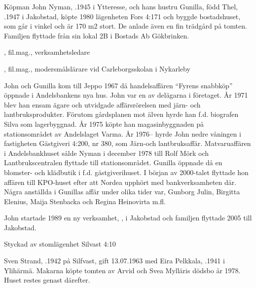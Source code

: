 %
Köpman John Nyman, .1945 i Ytteresse, och hans hustru Gunilla, född Thel, .1947 i Jakobstad, köpte 1980 lägenheten Fors 4:171 och byggde bostadshuset, som går i vinkel och är 170 m2 stort. De anlade även en fin trädgård på tomten. Familjen flyttade från sin lokal 2B i Bostads Ab Gökbrinken.
\begin{jhchildren}
  \item {}, fil.mag., verksamhetsledare
  \item {}, fil.mag., modersmålslärare vid Carleborgsskolan i Nykarleby
\end{jhchildren}
John och Gunilla kom till Jeppo 1967 då handelsaffären ``Fyrens snabbköp'' öppnade i Andelsbankens nya hus. John var en av delägarna i företaget. År 1971 blev han ensam ägare och utvidgade affärsrörelsen med järn- och lantbruksprodukter. Förutom gårdsplanen mot älven hyrde han f.d. biografen Silva som lagerbyggnad. År 1975 köpte han magasinbyggnaden på stationsområdet av Andelslaget Varma. År 1976-- hyrde John nedre våningen i fastigheten Gästgiveri 4:200, nr 380, som Järn-och lantbruksaffär. Matvaruaffären i Andelsbankhuset sålde Nyman i december 1978 till Rolf Mörk och Lantbrukscentralen flyttade till stationsområdet. Gunilla öppnade då en blomster- och klädbutik i f.d. gästgiverihuset. I början av 2000-talet flyttade hon affären till KPO-huset efter att Nordea upphört med bankverksamheten där. Några anställda i Gunillas affär under olika tider var, Gunborg Julin, Birgitta Elenius, Maija Stenbacka och Regina Heinovirta m.fl.

John startade 1989 en ny verksamhet, , i Jakobstad och familjen flyttade 2005 till Jakobstad.



%

Styckad av stomlägenhet Silvast 4:10


%
Sven Strand, .1942 på Silfvast, gift 13.07.1963 med Eira Pelkkala, .1941 i Ylihärmä. Makarna köpte tomten av Arvid och Svea Mylläris dödsbo år 1978. Huset restes genast därefter.


